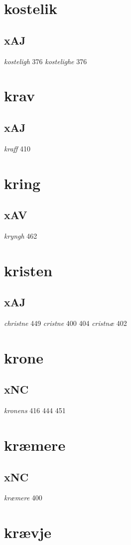 \documentclass[a4paper,twocolumn]{article}
\begin{document}
\section{kostelik}
\label{sec:org633bed4}
\subsection{xAJ}
\label{sec:org1bcbd41}
\emph{kosteligh} 376 \emph{kostelighe} 376 
\section{krav}
\label{sec:orgc96cc4f}
\subsection{xAJ}
\label{sec:org457c533}
\emph{kraff} 410 
\section{kring}
\label{sec:org5b5f5d0}
\subsection{xAV}
\label{sec:orgf5e6a5b}
\emph{kryngh} 462 
\section{kristen}
\label{sec:orge6cc4e5}
\subsection{xAJ}
\label{sec:org441ffa7}
\emph{christne} 449 \emph{cristne} 400 404 \emph{cristnæ} 402 
\section{krone}
\label{sec:org311f95d}
\subsection{xNC}
\label{sec:orgf2140c0}
\emph{kronens} 416 444 451 
\section{kræmere}
\label{sec:org59f9491}
\subsection{xNC}
\label{sec:org6fbdc0a}
\emph{kræmere} 400 
\section{krævje}
\label{sec:orgfd401f1}
\end{document}
